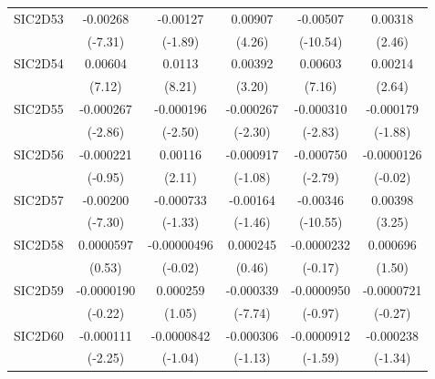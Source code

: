\begin{table}[htbp]
\begin{tabular}{l*{5}{c}}
SIC2D53     &    -0.00268\sym{***}&    -0.00127         &     0.00907\sym{***}&    -0.00507\sym{***}&     0.00318\sym{*}  \\
            &     (-7.31)         &     (-1.89)         &      (4.26)         &    (-10.54)         &      (2.46)         \\
SIC2D54     &     0.00604\sym{***}&      0.0113\sym{***}&     0.00392\sym{**} &     0.00603\sym{***}&     0.00214\sym{**} \\
            &      (7.12)         &      (8.21)         &      (3.20)         &      (7.16)         &      (2.64)         \\
SIC2D55     &   -0.000267\sym{**} &   -0.000196\sym{*}  &   -0.000267\sym{*}  &   -0.000310\sym{**} &   -0.000179         \\
            &     (-2.86)         &     (-2.50)         &     (-2.30)         &     (-2.83)         &     (-1.88)         \\
SIC2D56     &   -0.000221         &     0.00116\sym{*}  &   -0.000917         &   -0.000750\sym{**} &  -0.0000126         \\
            &     (-0.95)         &      (2.11)         &     (-1.08)         &     (-2.79)         &     (-0.02)         \\
SIC2D57     &    -0.00200\sym{***}&   -0.000733         &    -0.00164         &    -0.00346\sym{***}&     0.00398\sym{**} \\
            &     (-7.30)         &     (-1.33)         &     (-1.46)         &    (-10.55)         &      (3.25)         \\
SIC2D58     &   0.0000597         & -0.00000496         &    0.000245         &  -0.0000232         &    0.000696         \\
            &      (0.53)         &     (-0.02)         &      (0.46)         &     (-0.17)         &      (1.50)         \\
SIC2D59     &  -0.0000190         &    0.000259         &   -0.000339\sym{***}&  -0.0000950         &  -0.0000721         \\
            &     (-0.22)         &      (1.05)         &     (-7.74)         &     (-0.97)         &     (-0.27)         \\
SIC2D60     &   -0.000111\sym{*}  &  -0.0000842         &   -0.000306         &  -0.0000912         &   -0.000238         \\
            &     (-2.25)         &     (-1.04)         &     (-1.13)         &     (-1.59)         &     (-1.34)         \\

\end{tabular}
\end{table}
